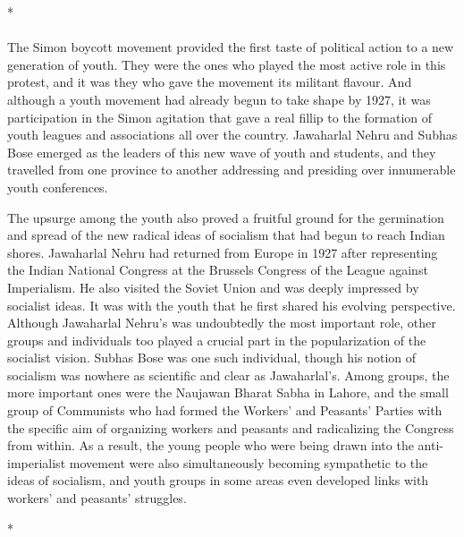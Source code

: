 \begin{center}*\end{center}

\paragraph*{}

The Simon boycott movement provided the first taste of political action to a new generation of youth. They were the ones who played the most active role in this protest, and it was they who gave the movement its militant flavour. And although a youth movement had already begun to take shape by 1927, it was participation in the Simon agitation that gave a real fillip to the formation of youth leagues and associations all over the country. Jawaharlal Nehru and Subhas Bose emerged as the leaders of this new wave of youth and students, and they travelled from one province to another addressing and presiding over innumerable youth conferences. 

The upsurge among the youth also proved a fruitful ground for the germination and spread of the new radical ideas of socialism that had begun to reach Indian shores. Jawaharlal Nehru had returned from Europe in 1927 after representing the Indian National Congress at the Brussels Congress of the League against Imperialism. He also visited the Soviet Union and was deeply impressed by socialist ideas. It was with the youth that he first shared his evolving perspective. Although Jawaharlal Nehru's was undoubtedly the most important role, other groups and individuals too played a crucial part in the popularization of the socialist vision. Subhas Bose was one such individual, though his notion of socialism was nowhere as scientific and clear as Jawaharlal's. Among groups, the more important ones were the Naujawan Bharat Sabha in Lahore, and the small group of Communists who had formed the Workers' and Peasants' Parties with the specific aim of organizing workers and peasants and radicalizing the Congress from within. As a result, the young people who were being drawn into the anti-imperialist movement were also simultaneously becoming sympathetic to the ideas of socialism, and youth groups in some areas even developed links with workers' and peasants' struggles.

\begin{center}*\end{center}

\paragraph*{}

